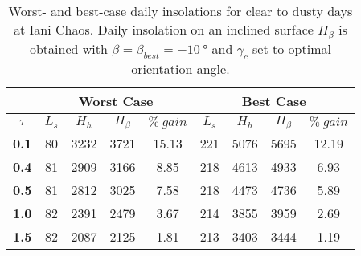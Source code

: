\begin{table}[h]
\footnotesize
\centering
\caption[Worst- and best-case daily insolations for clear to dusty days at Iani Chaos]
{Worst- and best-case daily insolations for clear to dusty days at Iani Chaos. Daily insolation on an inclined surface $H_{\beta}$ is obtained with $\beta = \beta_{best} = \SI{-10}{\degree}$ and $\gamma_{c}$ set to optimal orientation angle.}
\label{tab:insolation-iani-chaos-clear-and-dusty-days}
\begin{tabular}{c|c|c|c|c|c|c|c|c|}
\cline{2-9}
\multicolumn{1}{l|}{} & \multicolumn{4}{c|}{\textbf{Worst Case}} & \multicolumn{4}{c|}{\textbf{Best Case}} \\ \hline
\multicolumn{1}{|c|}{$\tau$} & $L_{s}$ & $H_{h}$ & $H_{\beta}$ & $\%\:gain$ & $L_{s}$ & $H_{h}$ & $H_{\beta}$ & $\%\:gain$ \\ \hline
\multicolumn{1}{|c|}{\textbf{0.1}} & 80 & 3232 & 3721 & 15.13 & 221 & 5076 & 5695 & 12.19 \\ \hline
\multicolumn{1}{|c|}{\textbf{0.4}} & 81 & 2909 & 3166 & 8.85 & 218 & 4613 & 4933 & 6.93 \\ \hline
\multicolumn{1}{|c|}{\textbf{0.5}} & 81 & 2812 & 3025 & 7.58 & 218 & 4473 & 4736 & 5.89 \\ \hline
\multicolumn{1}{|c|}{\textbf{1.0}} & 82 & 2391 & 2479 & 3.67 & 214 & 3855 & 3959 & 2.69 \\ \hline
\multicolumn{1}{|c|}{\textbf{1.5}} & 82 & 2087 & 2125 & 1.81 & 213 & 3403 & 3444 & 1.19 \\ \hline
\end{tabular}
\end{table}

